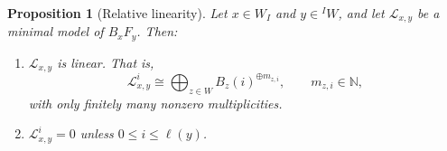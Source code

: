 \documentclass[11pt,a4paper]{article}
\numberwithin{equation}{section}
\newtheorem{proposition}[theorem]{Proposition}
\theoremstyle{remark}
\newcommand{\N}{\mathbb N}
\newcommand{\LL}{\mathcal L}
\newcommand{\Cone}{\operatorname{Cone}}
\begin{document}
%
%


\begin{proposition}[Relative linearity]\label{prop:linear}
	Let $x\in W_I$ and $y\in{}^I W$, and let
	$\LL_{x,y}$ be a minimal model of $B_xF_y$.
	Then:
	\begin{enumerate}
		\item $\LL_{x,y}$ is linear. That is,
		\[
		\LL_{x,y}^i\cong
		\bigoplus_{z\in W}B_z(i)^{\oplus m_{z,i}},
		\qquad m_{z,i}\in\N,
		\]
		with only finitely many nonzero multiplicities.
		
		\item $\LL_{x,y}^i=0$ unless
		$0\le i\le\ell(y)$.
	\end{enumerate}
\end{proposition}
\end{document}
